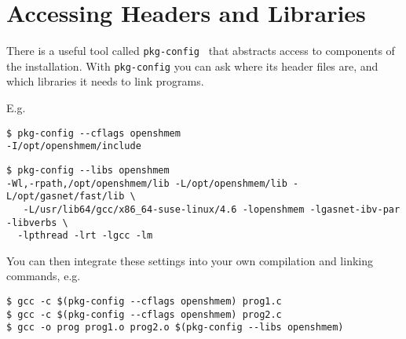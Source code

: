 \section{Accessing \openshmem Headers and Libraries}

There is a useful tool called \texttt{pkg-config}~\cite{pkg-config}
that abstracts access to components of the installation.  With
\texttt{pkg-config} you can ask \openshmem where its header files are,
and which libraries it needs to link programs.

E.g.

\begin{lstlisting}[numbers=none,label=pkg-config-cflags,caption={Finding the \openshmem header directory}]
$ pkg-config --cflags openshmem
-I/opt/openshmem/include
\end{lstlisting}

\begin{lstlisting}[numbers=none,label=pkg-config-libs,caption={Finding the \openshmem libraries}]
$ pkg-config --libs openshmem
-Wl,-rpath,/opt/openshmem/lib -L/opt/openshmem/lib -L/opt/gasnet/fast/lib \
   -L/usr/lib64/gcc/x86_64-suse-linux/4.6 -lopenshmem -lgasnet-ibv-par -libverbs \
  -lpthread -lrt -lgcc -lm
\end{lstlisting}

You can then integrate these settings into your own compilation and linking commands, e.g.

\begin{lstlisting}[numbers=none,label=pkg-config-usage,caption={Compiling with pkg-config}]
$ gcc -c $(pkg-config --cflags openshmem) prog1.c
$ gcc -c $(pkg-config --cflags openshmem) prog2.c
$ gcc -o prog prog1.o prog2.o $(pkg-config --libs openshmem)
\end{lstlisting}
